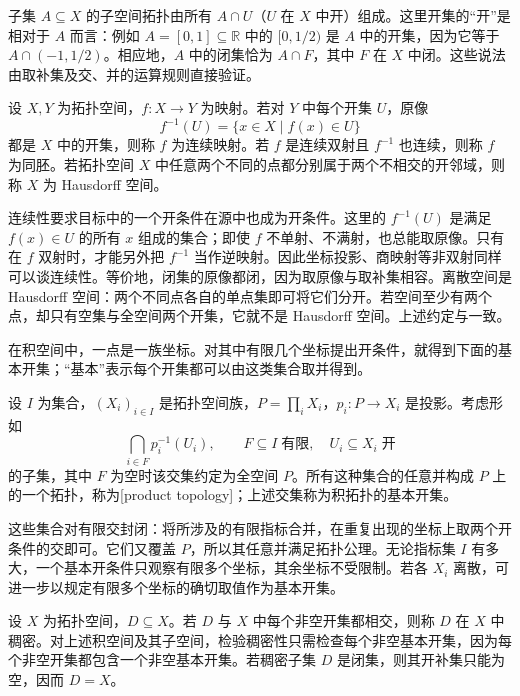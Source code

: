 \ProseParagraphBreak
子集 \(A\subseteq X\) 的子空间拓扑由所有 \(A\cap U\)（\(U\) 在 \(X\) 中开）组成。这里开集的“开”是相对于 \(A\) 而言：例如 \(A=[0,1]\subseteq\mathbb R\) 中的 \([0,1/2)\) 是 \(A\) 中的开集，因为它等于 \(A\cap(-1,1/2)\)。相应地，\(A\) 中的闭集恰为 \(A\cap F\)，其中 \(F\) 在 \(X\) 中闭。这些说法由取补集及交、并的运算规则直接验证。

\begin{definition}\label{b1:def:continuous-hausdorff-appendix}
	设 \(X,Y\) 为拓扑空间，\(f:X\rightarrow Y\) 为映射。若对 \(Y\) 中每个开集 \(U\)，原像
	\[
		f^{-1}(U)=\{x\in X\mid f(x)\in U\}
	\]
	都是 \(X\) 中的开集，则称 \(f\) 为连续映射。若 \(f\) 是连续双射且 \(f^{-1}\) 也连续，则称 \(f\) 为同胚。若拓扑空间 \(X\) 中任意两个不同的点都分别属于两个不相交的开邻域，则称 \(X\) 为 Hausdorff 空间。
\end{definition}

连续性要求目标中的一个开条件在源中也成为开条件。这里的 \(f^{-1}(U)\) 是满足 \(f(x)\in U\) 的所有 \(x\) 组成的集合；即使 \(f\) 不单射、不满射，也总能取原像。只有在 \(f\) 双射时，才能另外把 \(f^{-1}\) 当作逆映射。因此坐标投影、商映射等非双射同样可以谈连续性。等价地，闭集的原像都闭，因为取原像与取补集相容。离散空间是 Hausdorff 空间：两个不同点各自的单点集即可将它们分开。若空间至少有两个点，却只有空集与全空间两个开集，它就不是 Hausdorff 空间。上述约定与一致。

\ProseParagraphBreak
在积空间中，一点是一族坐标。对其中有限几个坐标提出开条件，就得到下面的基本开集；“基本”表示每个开集都可以由这类集合取并得到。

\begin{definition}\label{b1:def:product-topology-appendix}
	设 \(I\) 为集合，\((X_i)_{i\in I}\) 是拓扑空间族，\(P=\prod_iX_i\)，\(p_i:P\rightarrow X_i\) 是投影。考虑形如
	\[
		\bigcap_{i\in F}p_i^{-1}(U_i), \qquad F\subseteq I\;\text{有限},\quad U_i\subseteq X_i\;\text{开}
	\]
	的子集，其中 \(F\) 为空时该交集约定为全空间 \(P\)。所有这种集合的任意并构成 \(P\) 上的一个拓扑，称为[product topology]；上述交集称为积拓扑的基本开集。
\end{definition}

这些集合对有限交封闭：将所涉及的有限指标合并，在重复出现的坐标上取两个开条件的交即可。它们又覆盖 \(P\)，所以其任意并满足拓扑公理。无论指标集 \(I\) 有多大，一个基本开条件只观察有限多个坐标，其余坐标不受限制。若各 \(X_i\) 离散，可进一步以规定有限多个坐标的确切取值作为基本开集。

\ProseParagraphBreak
设 \(X\) 为拓扑空间，\(D\subseteq X\)。若 \(D\) 与 \(X\) 中每个非空开集都相交，则称 \(D\) 在 \(X\) 中稠密。对上述积空间及其子空间，检验稠密性只需检查每个非空基本开集，因为每个非空开集都包含一个非空基本开集。若稠密子集 \(D\) 是闭集，则其开补集只能为空，因而 \(D=X\)。

